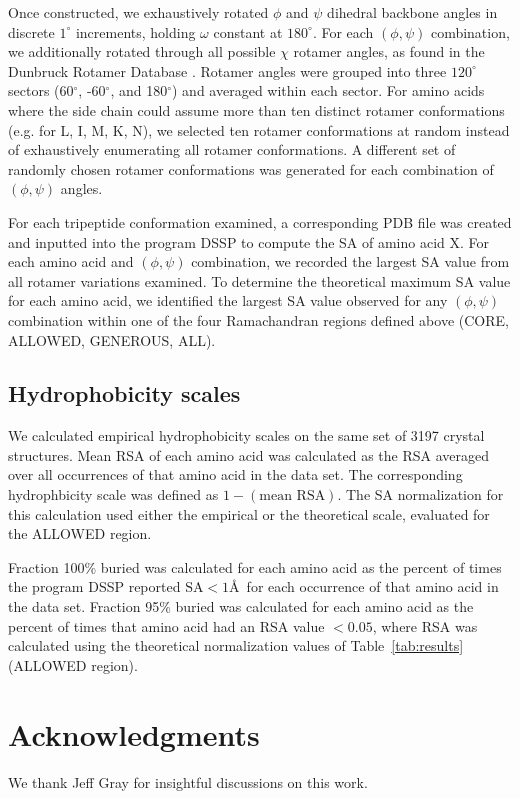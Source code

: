 \documentclass[11pt]{article}
\begin{document}
Once constructed, we exhaustively rotated $\phi$ and $\psi$ dihedral backbone angles in discrete $1^\circ$ increments, holding $\omega$ constant at $180^\circ$. For each $(\phi, \psi)$ combination, we additionally rotated through all possible $\chi$ rotamer angles, as found in the Dunbruck Rotamer Database \cite{WangDunbrack2003}. Rotamer angles were grouped into three $120^\circ$ sectors (60$^\circ$, -60$^\circ$, and 180$^\circ$) and averaged within each sector. For amino acids where the side chain could assume more than ten distinct rotamer conformations (e.g. for L, I, M, K, N), we selected ten rotamer conformations at random instead of exhaustively enumerating all rotamer conformations. A different set of randomly chosen rotamer conformations was generated for each combination of $(\phi, \psi)$ angles. 

For each tripeptide conformation examined, a corresponding PDB file was created and inputted into the program DSSP \cite{Kabsch1983} to compute the SA of amino acid X. For each amino acid and $(\phi, \psi)$ combination, we recorded the largest SA value from all rotamer variations examined. To determine the theoretical maximum SA value for each amino acid, we identified the largest SA value observed for any $(\phi, \psi)$ combination within one of the four Ramachandran regions defined above (CORE, ALLOWED, GENEROUS, ALL).

\subsection*{Hydrophobicity scales}

We calculated empirical hydrophobicity scales on the same set of 3197 crystal structures. Mean RSA of each amino acid was calculated as the RSA averaged over all occurrences of that amino acid in the data set. The corresponding hydrophbicity scale was defined as $1-(\text{mean RSA})$. The SA normalization for this calculation used either the empirical or the theoretical scale, evaluated for the ALLOWED region.

Fraction 100\% buried was calculated for each amino acid as the percent of times the program DSSP reported $\text{SA}<1$\AA\ for each occurrence of that amino acid in the data set. Fraction 95\% buried was calculated for each amino acid as the percent of times that amino acid had an RSA value $<0.05$, where RSA was calculated using the theoretical normalization values of Table~\ref{tab:results} (ALLOWED region).

\section*{Acknowledgments}
We thank Jeff Gray for insightful discussions on this work.
\end{document}
